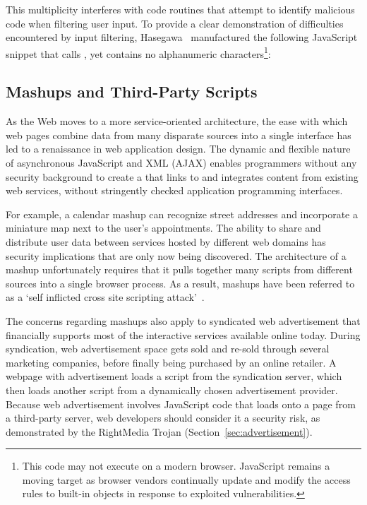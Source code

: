 This multiplicity interferes with code routines that attempt to identify malicious code when filtering user input.
To provide a clear demonstration of difficulties encountered by input filtering, Hasegawa~\cite{xssfilters} manufactured the following JavaScript snippet that calls , yet contains no alphanumeric characters\footnote{This code may not execute on a modern browser. JavaScript remains a moving target as browser vendors continually update and modify the access rules to built-in objects in response to exploited vulnerabilities.}:

\begin{jscode}
($=[$=[]][(__=!$+$)[_=-~-~-~$]+(\{\}+$)[_/_]+($$=($_=!''+$)
[_/_]+$_[+$])])()[__[_/_]+__[_+~$]+$_[_]+$$](_/_)
\end{jscode}

\subsection{Mashups and Third-Party Scripts}\label{sec:mashups}

As the Web moves to a more service-oriented architecture, the ease with which web pages combine data from many disparate sources into a single interface has led to a renaissance in web application design.
The dynamic and flexible nature of asynchronous JavaScript and XML (AJAX) enables programmers without any security background to create a  that links to and integrates content from existing web services, without stringently checked application programming interfaces.

For example, a calendar mashup can recognize street addresses and incorporate a miniature map next to the user's appointments.
The ability to share and distribute user data between services hosted by different web domains has security implications that are only now being discovered.
The architecture of a mashup unfortunately requires that it pulls together many scripts from different sources into a single browser process.
As a result, mashups have been referred to as a `self inflicted cross site scripting attack'~\cite{mashup}.

The concerns regarding mashups also apply to syndicated web advertisement that financially supports most of the interactive services available online today.
During syndication, web advertisement space gets sold and re-sold through several marketing companies, before finally being purchased by an online retailer.
A webpage with advertisement loads a script from the syndication server, which then loads another script from a dynamically chosen advertisement provider.
Because web advertisement involves JavaScript code that loads onto a page from a third-party server, web developers should consider it a security risk, as demonstrated by the RightMedia Trojan (Section~\ref{sec:advertisement}).

